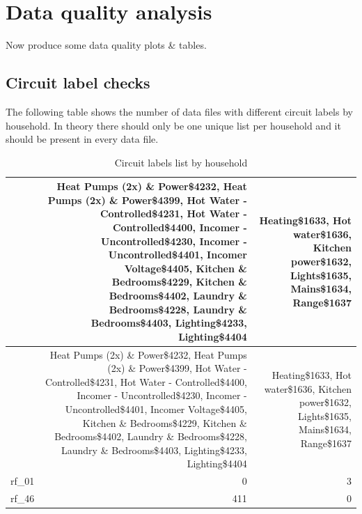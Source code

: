 \documentclass[]{article}
\newenvironment{Shaded}{\begin{snugshade}}{\end{snugshade}}
\newcommand{\KeywordTok}[1]{\textcolor[rgb]{0.13,0.29,0.53}{\textbf{#1}}}
\newcommand{\DataTypeTok}[1]{\textcolor[rgb]{0.13,0.29,0.53}{#1}}
\newcommand{\StringTok}[1]{\textcolor[rgb]{0.31,0.60,0.02}{#1}}
\newcommand{\CommentTok}[1]{\textcolor[rgb]{0.56,0.35,0.01}{\textit{#1}}}
\newcommand{\OperatorTok}[1]{\textcolor[rgb]{0.81,0.36,0.00}{\textbf{#1}}}
\newcommand{\NormalTok}[1]{#1}
\begin{document}
\section{Data quality analysis}\label{data-quality-analysis}

Now produce some data quality plots \& tables.

\subsection{Circuit label checks}\label{circuit-label-checks}

The following table shows the number of data files with different
circuit labels by household. In theory there should only be one unique
list per household and it should be present in every data file.

\begin{Shaded}
\end{Shaded}

\begin{longtable}[]{@{}lrr@{}}
\caption{Circuit labels list by household}\tabularnewline
\toprule
& Heat Pumps (2x) \& Power\$4232, Heat Pumps (2x) \& Power\$4399, Hot
Water - Controlled\$4231, Hot Water - Controlled\$4400, Incomer -
Uncontrolled\$4230, Incomer - Uncontrolled\$4401, Incomer Voltage\$4405,
Kitchen \& Bedrooms\$4229, Kitchen \& Bedrooms\$4402, Laundry \&
Bedrooms\$4228, Laundry \& Bedrooms\$4403, Lighting\$4233,
Lighting\$4404 & Heating\$1633, Hot water\$1636, Kitchen power\$1632,
Lights\$1635, Mains\$1634, Range\$1637\tabularnewline
\midrule
\endfirsthead
\toprule
& Heat Pumps (2x) \& Power\$4232, Heat Pumps (2x) \& Power\$4399, Hot
Water - Controlled\$4231, Hot Water - Controlled\$4400, Incomer -
Uncontrolled\$4230, Incomer - Uncontrolled\$4401, Incomer Voltage\$4405,
Kitchen \& Bedrooms\$4229, Kitchen \& Bedrooms\$4402, Laundry \&
Bedrooms\$4228, Laundry \& Bedrooms\$4403, Lighting\$4233,
Lighting\$4404 & Heating\$1633, Hot water\$1636, Kitchen power\$1632,
Lights\$1635, Mains\$1634, Range\$1637\tabularnewline
\midrule
\endhead
rf\_01 & 0 & 3\tabularnewline
rf\_46 & 411 & 0\tabularnewline
\bottomrule
\end{longtable}
\end{document}
